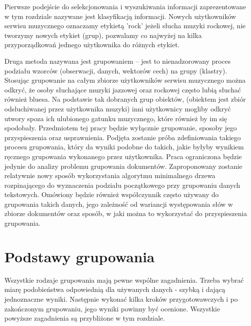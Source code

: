 \documentclass{article}
\begin{document}
Pierwsze podejście do selekcjonowania i wyszukiwania informacji zaprezentowane w tym rozdziale nazywane jest klasyfikacją informacji. Nowych użytkowników serwisu muzycznego oznaczamy etykietą 'rock' jeżeli słucha muzyki rockowej, nie tworzymy nowych etykiet (grup), pozwalamy co najwyżej na kilka przyporządkowań jednego użytkownika do różnych etykiet. 

Druga metoda nazywana jest grupowaniem – jest to nienadzorowany proces podziału wzorców (obserwacji, danych, wektorów cech) na grupy (klastry). Stosując grupowanie na całym zbiorze użytkowników serwisu muzycznego można odkryć, że osoby słuchające muzyki jazzowej oraz rockowej często lubią słuchać również bluesa. Na podstawie tak dobranych grup obiektów, (obiektem jest zbiór odsłuchiwanej przez użytkownika muzyki) inni użytkownicy mogliby odkryć utwory spoza ich ulubionego gatunku muzycznego, które również by im się spodobały.  Przedmiotem tej pracy będzie wyłącznie grupowanie, sposoby jego przyspieszenia oraz usprawnienia. Podjęta zostanie próba zdefiniowania takiego procesu grupowania, który da wyniki podobne do takich, jakie byłyby wynikiem ręcznego grupowania wykonanego przez użytkownika. Praca ograniczona będzie jedynie do analizy problemu grupowania dokumentów.
Zaproponowany zostanie relatywnie nowy sposób wykorzystania algorytmu minimalnego drzewa rozpinającego do wyznaczenia podziału początkowego przy grupowaniu danych tekstowych. Omówiony będzie również współczynnik często używany do grupowania takich danych, jego zależność od wariancji występowania słów w zbiorze dokumentów oraz sposób, w jaki można to wykorzystać do przyspieszenia grupowania.

\newpage
\section{Podstawy grupowania}

Wszystkie rodzaje grupowania mają pewne wspólne zagadnienia. Trzeba wybrać miarę podobieństwa odpowiednią dla używanych danych - szybką i dającą jednoznaczne wyniki. Następnie wykonać kilka kroków przygotowawczych i po zakończonym grupowaniu, jego wyniki powinny być ocenione. Wszystkie powyższe zagadnienia są przybliżone w tym rozdziale.
\end{document}

